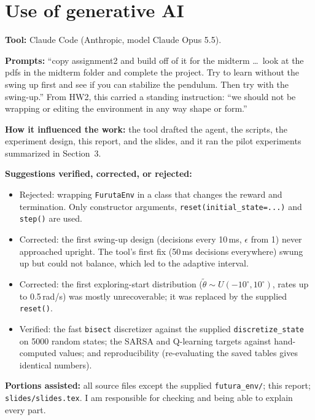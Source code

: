 \documentclass[11pt]{article}
\newcommand{\thw}{\tilde\theta}
\begin{document}
\appendix
\section{Use of generative AI}

\textbf{Tool:} Claude Code (Anthropic, model Claude Opus 5.5).

\textbf{Prompts:} ``copy assignment2 and build off of it for the midterm \ldots\ look at the pdfs in
the midterm folder and complete the project. Try to learn without the swing up first and see if
you can stabilize the pendulum. Then try with the swing-up.'' From HW2, this carried a standing
instruction: ``we should not be wrapping or editing the environment in any way shape or form.''

\textbf{How it influenced the work:} the tool drafted the agent, the scripts, the experiment design,
this report, and the slides, and it ran the pilot experiments summarized in Section~3.

\textbf{Suggestions verified, corrected, or rejected:}
\begin{itemize}
\item Rejected: wrapping \texttt{FurutaEnv} in a class that changes the reward and termination.
Only constructor arguments, \texttt{reset(initial\_state=...)} and \texttt{step()} are used.
\item Corrected: the first swing-up design (decisions every 10\,ms, $\epsilon$ from 1) never
approached upright. The tool's first fix (50\,ms decisions everywhere) swung up but could not
balance, which led to the adaptive interval.
\item Corrected: the first exploring-start distribution ($\thw\sim U(-10^\circ,10^\circ)$, rates up
to 0.5\,rad/s) was mostly unrecoverable; it was replaced by the supplied \texttt{reset()}.
\item Verified: the fast \texttt{bisect} discretizer against the supplied \texttt{discretize\_state}
on 5000 random states; the SARSA and Q-learning targets against hand-computed values; and
reproducibility (re-evaluating the saved tables gives identical numbers).
\end{itemize}

\textbf{Portions assisted:} all source files except the supplied \texttt{futura\_env/}; this report;
\texttt{slides/slides.tex}. I am responsible for checking and being able to explain every part.
\end{document}
